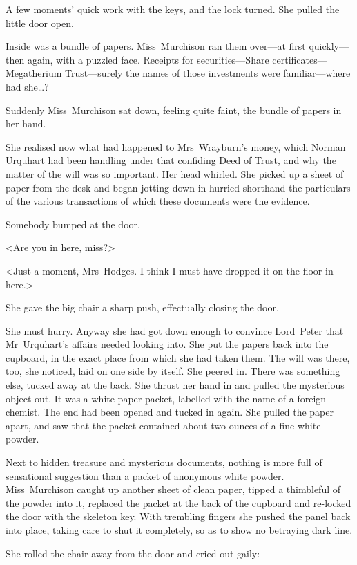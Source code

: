 A few moments' quick work with the keys, and the lock turned. She pulled the little door open.

Inside was a bundle of papers. Miss~Murchison ran them over—at first quickly—then again, with a puzzled face. Receipts for securities—Share certificates—Megatherium Trust—surely the names of those investments were familiar—where had she\dots?

Suddenly Miss~Murchison sat down, feeling quite faint, the bundle of papers in her hand.

She realised now what had happened to Mrs~Wrayburn's money, which Norman Urquhart had been handling under that confiding Deed of Trust, and why the matter of the will was so important. Her head whirled. She picked up a sheet of paper from the desk and began jotting down in hurried shorthand the particulars of the various transactions of which these documents were the evidence.

Somebody bumped at the door.

<Are you in here, miss?>

<Just a moment, Mrs~Hodges. I think I must have dropped it on the floor in here.>

She gave the big chair a sharp push, effectually closing the door.

She must hurry. Anyway she had got down enough to convince Lord~Peter that Mr~Urquhart's affairs needed looking into. She put the papers back into the cupboard, in the exact place from which she had taken them. The will was there, too, she noticed, laid on one side by itself. She peered in. There was something else, tucked away at the back. She thrust her hand in and pulled the mysterious object out. It was a white paper packet, labelled with the name of a foreign chemist. The end had been opened and tucked in again. She pulled the paper apart, and saw that the packet contained about two ounces of a fine white powder.

Next to hidden treasure and mysterious documents, nothing is more full of sensational suggestion than a packet of anonymous white powder. Miss~Murchison caught up another sheet of clean paper, tipped a thimbleful of the powder into it, replaced the packet at the back of the cupboard and re-locked the door with the skeleton key. With trembling fingers she pushed the panel back into place, taking care to shut it completely, so as to show no betraying dark line.

She rolled the chair away from the door and cried out gaily:

